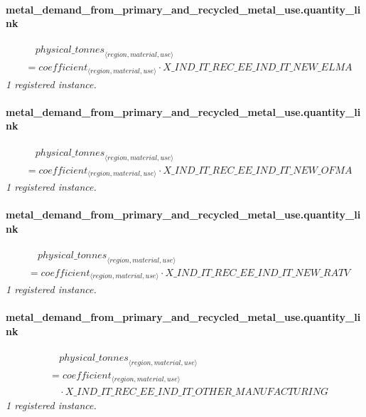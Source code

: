 \documentclass[11pt]{article}
\begin{document}
\paragraph{metal\_demand\_from\_primary\_and\_recycled\_metal\_use.quantity\_link}
\begin{align*}
&\quad {physical\_tonnes}_{\langle region, material, use\rangle}\\
&= coefficient_{\langle region, material, use\rangle} \cdot X\_IND\_IT\_REC\_EE\_IND\_IT\_NEW\_ELMA
\end{align*}
\noindent\emph{1 registered instance.}\par
\paragraph{metal\_demand\_from\_primary\_and\_recycled\_metal\_use.quantity\_link}
\begin{align*}
&\quad {physical\_tonnes}_{\langle region, material, use\rangle}\\
&= coefficient_{\langle region, material, use\rangle} \cdot X\_IND\_IT\_REC\_EE\_IND\_IT\_NEW\_OFMA
\end{align*}
\noindent\emph{1 registered instance.}\par
\paragraph{metal\_demand\_from\_primary\_and\_recycled\_metal\_use.quantity\_link}
\begin{align*}
&\quad {physical\_tonnes}_{\langle region, material, use\rangle}\\
&= coefficient_{\langle region, material, use\rangle} \cdot X\_IND\_IT\_REC\_EE\_IND\_IT\_NEW\_RATV
\end{align*}
\noindent\emph{1 registered instance.}\par
\paragraph{metal\_demand\_from\_primary\_and\_recycled\_metal\_use.quantity\_link}
\begin{align*}
&\quad {physical\_tonnes}_{\langle region, material, use\rangle}\\
&= coefficient_{\langle region, material, use\rangle}\\
&\quad {}\cdot X\_IND\_IT\_REC\_EE\_IND\_IT\_OTHER\_MANUFACTURING
\end{align*}
\noindent\emph{1 registered instance.}\par
\end{document}
